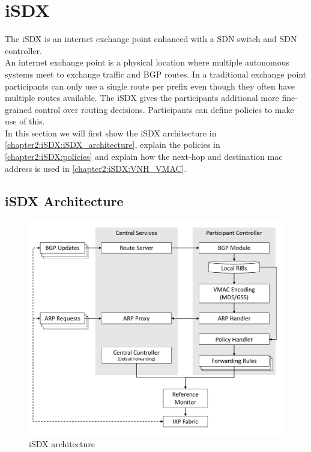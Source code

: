 \section{\label{chapter2:iSDX}iSDX}

The iSDX is an internet exchange point enhanced with a SDN switch and SDN controller.\\
An internet exchange point is a physical location where multiple autonomous systems meet to exchange traffic and BGP routes. In a traditional exchange point participants can only use a single route per prefix even though they often have multiple routes available. The iSDX gives the participants additional more fine-grained control over routing decisions. Participants can define policies to make use of this.  \\
In this section we will first show the iSDX architecture in \ref{chapter2:iSDX:iSDX_architecture}, explain the policies in \ref{chapter2:iSDX:policies} and explain how the next-hop and destination mac address is used in \ref{chapter2:iSDX:VNH_VMAC}.

\subsection{\label{chapter2:iSDX:iSDX_architecture}iSDX Architecture}
\begin{figure}[h]
\includegraphics[scale = 0.4]{Figures/bckdgrnd_sdx_architecture_cropped.pdf}
\caption{iSDX architecture}
\end{figure}

